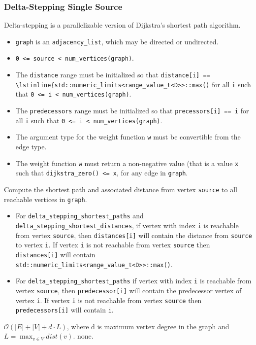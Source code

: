 \subsubsection{Delta-Stepping Single Source}

{\small

}


\begin{itemdescr}
\pnum Delta-stepping is a parallelizable version of Dijkstra's shortest path algorithm.
\pnum\preconditions
\begin{itemize}
\item
\lstinline{graph} is an \lstinline{adjacency_list}, which may be directed or
undirected.
\item
\lstinline{0 <= source < num_vertices(graph)}.
\item
  The \lstinline{distance} range must be initialized so that 
    \lstinline{distance[i] == \lstinline{std::numeric_limits<range_value_t<D>>::max()} 
      for all \lstinline{i}
      such that \lstinline{0 <= i < num_vertices(graph)}.  
\item
  The \lstinline{predecessors} range must be initialized so that
  \lstinline{precessors[i] == i} for all \lstinline{i} such that 
  \lstinline{0 <= i < num_vertices(graph)}.
\end{itemize}
\pnum\requires
\begin{itemize}
\item
  The argument type for the weight
  function \lstinline{w} must be convertible from the edge type.
\item
  The weight function \lstinline{w} must return a non-negative value (that is
  a value \lstinline{x} such that \lstinline{dijkstra_zero() <= x},
  for any edge in \lstinline{graph}.
\end{itemize}
\pnum\effects Compute the shortest path and associated distance from vertex
\lstinline{source} to all reachable vertices in \lstinline{graph}.
\pnum\returns
\begin{itemize}
\item For \lstinline{delta_stepping_shortest_paths} and \lstinline{delta_stepping_shortest_distances},
  if vertex with index \lstinline{i} is reachable from vertex \lstinline{source}, then
  \lstinline{distances[i]} will contain the distance from \lstinline{source} to vertex
  \lstinline{i}.  If vertex \lstinline{i} is not reachable from vertex
  \lstinline{source} then \lstinline{distances[i]} will contain
  \lstinline{std::numeric_limits<range_value_t<D>>::max()}.
\item
For \lstinline{delta_stepping_shortest_paths} if vertex with index \lstinline{i} is reachable
from vertex \lstinline{source}, then \lstinline{predecessor[i]} will contain the
predecessor vertex of vertex \lstinline{i}.  If vertex \lstinline{i} is not reachable
from vertex \lstinline{source} then \lstinline{predecessors[i]} will contain
\lstinline{i}.
\end{itemize}
%
\pnum\complexity $\mathcal{O}(|E| + |V| + d\cdot L)$, where d is maximum vertex degree in the graph and $L = \max_{v\in V} dist(v)$.
\pnum\throws none. 
\end{itemdescr}
